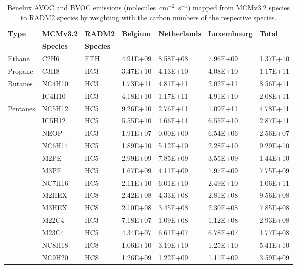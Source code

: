 \footnotesize
\begin{longtable}{lllllll}
	\caption{Benelux AVOC and BVOC emissions (molecules~cm$^{-2}$~s$^{-1}$) mapped from MCMv3.2 species to RADM2 species by weighting with the carbon numbers of the respective species.}\\%
	\hline \hline
	\multirow{2}{*}{\textbf{Type}} & \textbf{MCMv3.2} & \textbf{RADM2} & \multirow{2}{*}{\textbf{Belgium}} & \multirow{2}{*}{\textbf{Netherlands}} & \multirow{2}{*}{\textbf{Luxembourg}} & \multirow{2}{*}{\textbf{Total}} \\
 & \textbf{Species} & \textbf{Species} & & & & \\
	\endhead
	\hline
	Ethane & C2H6 & ETH & 4.91E+09 & 8.58E+08 & 7.96E+09 & 1.37E+10 \\
	\hline Propane & C3H8 & HC3 & 3.47E+10 & 4.13E+10 & 4.08E+10 & 1.17E+11 \\ \hline
	\multirow{2}{*}{Butanes} & NC4H10 & HC3 & 1.73E+11 & 4.81E+11 & 2.02E+11 & 8.56E+11 \\
	 & IC4H10 & HC3 & 4.18E+10 & 1.17E+11 & 4.91E+10 & 2.08E+11 \\
	\hline \multirow{3}{*}{Pentanes} & NC5H12 & HC5 & 9.26E+10 & 2.76E+11 & 1.09E+11 & 4.78E+11 \\
	 & IC5H12 & HC5 & 5.55E+10 & 1.66E+11 & 6.55E+10 & 2.87E+11 \\
	 & NEOP & HC3 & 1.91E+07 & 0.00E+00 & 6.54E+06 & 2.56E+07 \\
	\hline \parbox[t]{2mm}{} & NC6H14 & HC5 & 1.89E+10 & 5.12E+10 & 2.28E+10 & 9.29E+10 \\
	 & M2PE & HC5 & 2.99E+09 & 7.85E+09 & 3.55E+09 & 1.44E+10 \\
	 & M3PE & HC5 & 1.67E+09 & 4.11E+09 & 1.97E+09 & 7.75E+09 \\
	 & NC7H16 & HC5 & 2.11E+10 & 6.01E+10 & 2.49E+10 & 1.06E+11 \\
	 & M2HEX & HC8 & 2.42E+08 & 4.33E+08 & 2.81E+08 & 9.56E+08 \\
	 & M3HEX & HC8 & 2.10E+08 & 3.45E+08 & 2.30E+08 & 7.85E+08 \\
	 & M22C4 & HC3 & 7.18E+07 & 1.09E+08 & 1.12E+08 & 2.93E+08 \\
	 & M23C4 & HC5 & 4.34E+07 & 6.61E+07 & 6.78E+07 & 1.77E+08 \\
	 & NC8H18 & HC8 & 1.06E+10 & 3.10E+10 & 1.25E+10 & 5.41E+10 \\
	 & NC9H20 & HC8 & 1.26E+09 & 1.22E+09 & 1.11E+09 & 3.59E+09 \\

\end{longtable}

